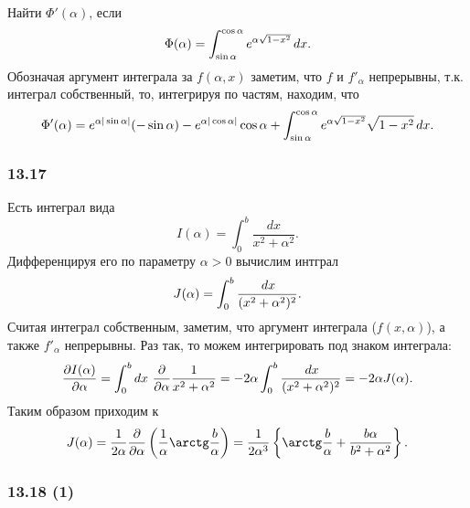 Найти $\Phi'(\alpha)$, если 
\begin{equation*}
    \Phi(\alpha) = \int_{\sin \alpha}^{\cos \alpha} e^{\alpha\sqrt{1-x^2}} \, d x.
\end{equation*}
Обозначая аргумент интеграла за $f(\alpha, x)$ заметим, что $f$ и $f'_\alpha$ непрерывны, т.к. интеграл собственный, то, интегрируя по частям, находим, что
\begin{equation*}
    \Phi'(\alpha) = e^{\alpha |\sin \alpha|} (-\sin \alpha) - e^{\alpha |\cos \alpha|} \cos \alpha + \int_{\sin \alpha}^{\cos \alpha} e^{\alpha \sqrt{1-x^2}} \sqrt{1-x^2} \, d x.
\end{equation*}




\subsubsection*{13.17}

Есть интеграл вида
\begin{equation*}
    I(\alpha) = \int_0^b \frac{d x}{x^2 + \alpha^2}.
\end{equation*}
Дифференцируя его по параметру $\alpha > 0$ вычислим интграл
\begin{equation*}
    J(\alpha) = \int_0^b \frac{\, d x}{(x^2 + \alpha^2)^2}.
\end{equation*}
Считая интеграл собственным, заметим, что аргумент интеграла ($f(x, \alpha)$), а также $f'_\alpha$ непрерывны. Раз так, то можем интегрировать под знаком интеграла:
\begin{equation*}
    \frac{\partial I(\alpha)}{\partial \alpha} = \int_0^b dx \ \frac{\partial }{\partial \alpha} \frac{1}{x^2+\alpha^2} = - 2 \alpha \int_0^b \frac{\, d x}{(x^2 + \alpha^2)^2} = - 2 \alpha J(\alpha).
\end{equation*}
Таким образом приходим к
\begin{equation*}
    J(\alpha) = \frac{1}{2\alpha} \frac{\partial }{\partial \alpha} \left(
        \frac{1}{\alpha} \arctg \frac{b}{\alpha}
    \right) = \frac{1}{2\alpha^3} \left\{
        \arctg \frac{b}{\alpha} + \frac{b \alpha}{b^2 + \alpha^2}
    \right\}.
\end{equation*}





\subsubsection*{13.18 (1) }

